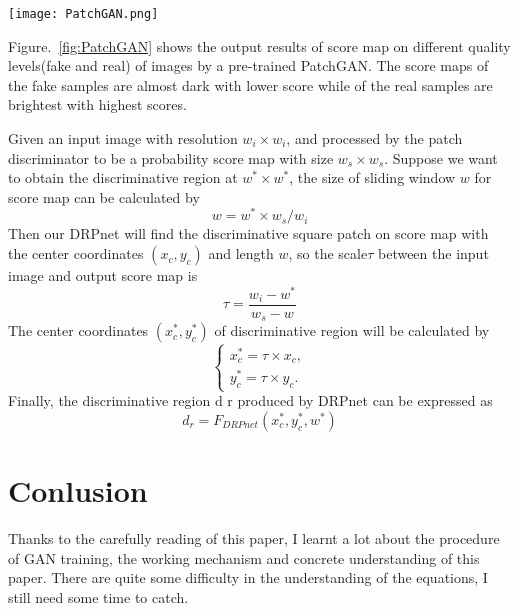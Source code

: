 \documentclass[10pt,twocolumn,letterpaper]{article}
\begin{document}
\begin{figure*}
\begin{center}
   \texttt{[image: PatchGAN.png]}
\end{center}
   \caption{The output results of score map on different quality levels (fake and real) of images by a pre-trained PatchGAN. The darkest regions on score maps mean the lowest quality, indicating that patch-based discriminators can be explored for discriminative region proposal.~\cite{Wang2017Discriminative}}
\label{fig:PatchGAN}
\end{figure*}

Figure.~\ref{fig:PatchGAN} shows the output results of score map on different quality levels(fake and real) of images by a pre-trained PatchGAN. The score maps of the fake samples are almost dark with lower score while of the real samples are brightest with highest scores.\par
Given an input image with resolution $w_i \times w_i$, and processed by the patch discriminator to be a probability score map with size $w_s \times w_s$. Suppose we want to obtain the discriminative region at $w^* \times w^*$, the size of sliding window $w$ for score map can be calculated by
\begin{equation}
w=w^* \times w_s/w_i
\end{equation}
Then our DRPnet will find the discriminative square patch on score map with the center coordinates $(x_c,y_c)$ and length $w$, so the scale$\tau$ between the input image and output score map is
\begin{equation}
\tau=\frac{w_i-w^*}{w_s-w}
\end{equation}
The center coordinates $(x_c^*,y_c^*)$ of discriminative region will be calculated by
\begin{equation}
\begin{cases}
x_c^*=\tau\times x_c,\\
y_c^*=\tau\times y_c.
\end{cases}
\end{equation}
Finally, the discriminative region d r produced by DRPnet can be expressed as
\begin{equation}
d_r=F_{DRPnet}(x_c^*,y_c^*,w^*)
\end{equation}


\section{Conlusion}
Thanks to the carefully reading of this paper, I learnt a lot about the procedure of GAN training, the working mechanism and concrete understanding of this paper. There are quite some difficulty in the understanding of the equations, I still need some time to catch.

{\small


}
\end{document}
